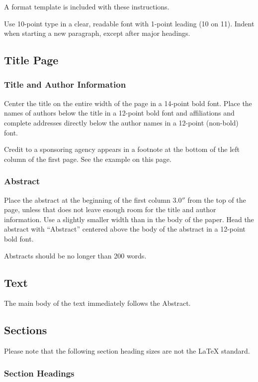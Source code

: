 A format template is included with these instructions.

Use 10-point type in a clear, readable font with 1-point leading (10
on 11).  Indent when starting a new paragraph, except after major headings.

\subsection{Title Page}

\subsubsection{Title and Author Information}

Center the title on the entire width of the page in a 14-point bold font.
Place the names of authors below the title in a 12-point bold font and
affiliations and complete addresses directly below the author names in a
12-point (non-bold) font.

Credit to a sponsoring agency appears in a footnote at the bottom of the
left column of the first page.  See the example on this page.

\subsubsection{Abstract}

Place the abstract at the beginning of the first column $3.0''$ from the
top of the page, unless that does not leave enough room for the title and
author information.  Use a slightly smaller width than in the body of the
paper.  Head the abstract with ``Abstract'' centered above the body of the
abstract in a 12-point bold font.

Abstracts should be no longer than 200 words.

\subsection{Text}
The main body of the text immediately follows the Abstract. 

\subsection{Sections}

Please note that the following section heading sizes are not the \LaTeX{}
standard.

\subsubsection{Section Headings}

